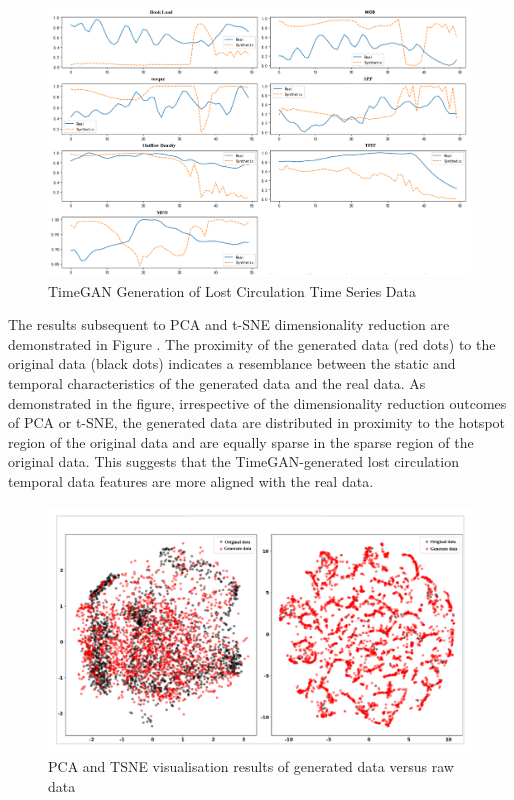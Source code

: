 \documentclass[journal,article,submit,pdftex,moreauthors]{Definitions/mdpi}
\begin{document}
\begin{figure}[h]
    \centering
    \includegraphics[width=0.75\linewidth]{图片/timeGan数据生成.png}
    \caption{TimeGAN Generation of Lost Circulation Time Series Data}
    \label{fig:TimeGAN Generation of Lost Circulation Time Series Data}
\end{figure}


The results subsequent to PCA and t-SNE dimensionality reduction are demonstrated in Figure \label{fig:PCA and TSNE visualisation results of generated data versus raw data}. The proximity of the generated data (red dots) to the original data (black dots) indicates a resemblance between the static and temporal characteristics of the generated data and the real data. As demonstrated in the figure, irrespective of the dimensionality reduction outcomes of PCA or t-SNE, the generated data are distributed in proximity to the hotspot region of the original data and are equally sparse in the sparse region of the original data. This suggests that the TimeGAN-generated lost circulation temporal data features are more aligned with the real data.

\begin{figure}[h]
    \centering
    \includegraphics[width=0.75\linewidth]{图片/pca tsne.png}
    \caption{PCA and TSNE visualisation results of generated data versus raw data}
    \label{fig:PCA and TSNE visualisation results of generated data versus raw data}
\end{figure}
\end{document}
